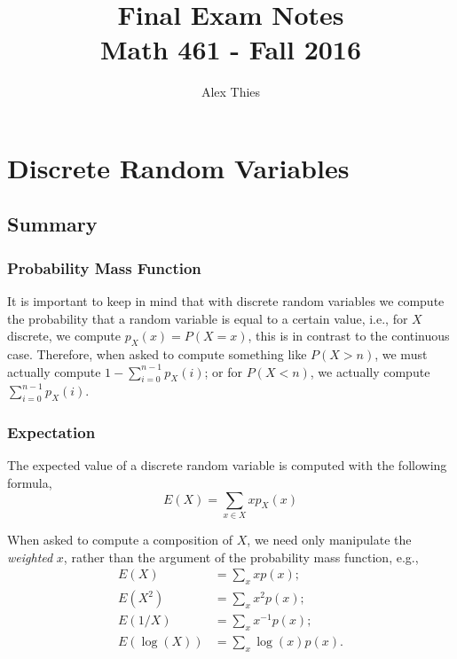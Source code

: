 \documentclass{amsart}
\begin{document}
	\author{Alex Thies}
	\title{Final Exam Notes \\ Math 461 - Fall 2016}

	\maketitle
	
	\section{Discrete Random Variables}
		\subsection{Summary}
			\subsubsection{Probability Mass Function}
			
			It is important to keep in mind that with discrete random variables we compute the probability that a random variable is equal to a certain value, i.e., for $X$ discrete, we compute $p_{X}(x) = P(X = x)$, this is in contrast to the continuous case. Therefore, when asked to compute something like $P(X > n)$, we must actually compute $1 - \sum_{i=0}^{n-1}p_{X}(i)$; or for $P(X < n)$, we actually compute $\sum_{i=0}^{n-1} p_{X}(i)$.
			
				\subsubsection{Expectation} 
				The expected value of a discrete random variable is computed with the following formula,
					$$
						E(X) = \sum_{x \in X} x p_{X}(x)
					$$				
					
					When asked to compute a composition of $X$, we need only manipulate the \textit{weighted} $x$, rather than the argument of the probability mass function, e.g.,
					\begin{align*}
						E(X) &=  \sum_{x} x p(x); \\
						E(X^{2}) &=  \sum_{x} x^{2} p(x); \\
						E(1/X) &=  \sum_{x} x^{-1} p(x); \\
						E(\log(X)) &= \sum_{x} \log(x) p(x).
					\end{align*}
					
\end{document}

